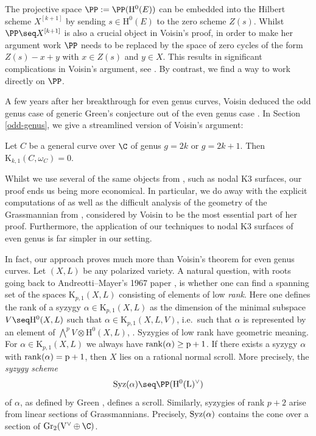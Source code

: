 The projective space $\PP:=\PP(\mathrm{H}^0(E))$ can be embedded into the Hilbert scheme $X^{[k+1]}$ by sending $s\in \mathrm{H}^0(E)$ to the zero scheme $Z(s)$. Whilst $\PP \seq X^{[k+1]}$ is also a crucial object in Voisin's proof, in order to make her argument work $\PP$ needs to be replaced by the space of zero cycles of the form $Z(s)-x+y$ with $x \in Z(s)$ and $y \in X$. This results in significant complications in Voisin's argument, see \cite[\S 6.3]{aprodu-nagel}. By contrast, we find a way to work directly on $\PP$.

  A few years after her breakthrough for even genus curves, Voisin deduced the odd genus case of generic Green's conjecture out of the even genus case \cite{V2}. In Section \ref{odd-genus}, we give a streamlined version of Voisin's argument:
  \begin{thm}
\notready \label{generic-green}
  Let $C$ be a general curve over $\C$ of genus $g=2k$ or $g=2k+1$. Then $\mathrm{K}_{k,1}(C,\omega_C)=0$.
  \end{thm}


 Whilst we use several of the same objects from \cite{V2}, such as nodal K3 surfaces, our proof ends us being more economical. In particular, we do away with the explicit computations of \cite[\S 2]{V2} as well as the difficult analysis of the geometry of the Grassmannian from \cite[\S 3, ``Fourth Step'']{V2}, considered by Voisin to be the most essential part of her proof. Furthermore, the application of our techniques to nodal K3 surfaces of even genus is far simpler in our setting.

In fact, our approach proves much more than Voisin's theorem for even genus curves. Let $(X,L)$ be any polarized variety. A natural question, with roots going back to Andreotti--Mayer's 1967 paper \cite{andreotti-mayer}, is whether one can find a spanning set of the spaces $\mathrm{K}_{p,1}(X,L)$ consisting of elements of low \emph{rank}. Here one defines the rank of a syzygy $\alpha \in \mathrm{K}_{p,1}(X,L)$ as the dimension of the minimal subspace
$V \seq \mathrm{H}^0(X,L)$ such that $\alpha \in \mathrm{K}_{p,1}(X,L,V)$, i.e.\ such that $\alpha$ is represented by an element of $\bigwedge^p V \otimes \mathrm{H}^0(X,L)$, \cite{bothmer-JPAA}. Syzygies of low rank have geometric meaning. For $\alpha \in \mathrm{K}_{p,1}(X,L)$ we always have $\rm{rank}(\alpha) \geq p+1$. If there exists a syzygy $\alpha$ with $\rm{rank}(\alpha)=p+1$, then $X$ lies on a rational normal scroll. More precisely, the \emph{syzygy scheme} $$\rm{Syz}(\alpha) \seq \PP(\mathrm{H}^0(L)^{\vee})$$ of $\alpha$, as defined by Green \cite{green-canonical}, defines a scroll. Similarly, syzygies of rank $p+2$ arise from linear sections of Grassmannians. Precisely, $\rm{Syz}(\alpha)$ contains the cone over a section of $\rm{Gr}_2(V^{\vee} \oplus \C)$.

